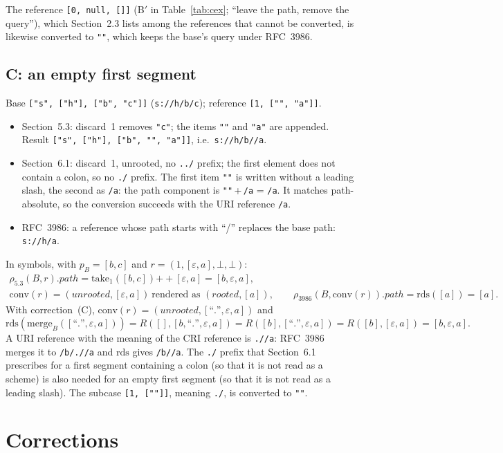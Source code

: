 \documentclass[11pt,a4paper]{article}
\theoremstyle{remark}
\newcommand{\cri}[1]{\texttt{#1}}
\newcommand{\uri}[1]{\texttt{#1}}
\newcommand{\rds}{\mathrm{rds}}
\newcommand{\mergef}{\mathrm{merge}}
\newcommand{\take}[1]{\mathrm{take}_{#1}}
\newcommand{\res}{\rho_{5.3}}
\newcommand{\rfc}{\rho_{3986}}
\newcommand{\conv}{\mathrm{conv}}
\newcommand{\e}{\varepsilon}
\newcommand{\seq}[1]{[#1]}
\begin{document}
The reference \cri{[0, null, []]} (B$'$ in Table~\ref{tab:cex}; ``leave the path, remove the query''),
which Section~2.3 lists among the references that cannot be converted, is likewise converted to
\uri{""}, which keeps the base's query under RFC~3986.

\subsection{C: an empty first segment}
Base \cri{["s", ["h"], ["b", "c"]]} (\uri{s://h/b/c}); reference \cri{[1, ["", "a"]]}.
\begin{itemize}[nosep]
\item Section~5.3: discard~1 removes \cri{"c"}; the items \cri{""} and \cri{"a"} are appended. Result
\cri{["s", ["h"], ["b", "", "a"]]}, i.e.\ \uri{s://h/b//a}.
\item Section~6.1: discard~1, unrooted, no \uri{../} prefix; the first element does not contain a colon,
so no \uri{./} prefix. The first item \cri{""} is written without a leading slash, the second as
\uri{/a}: the path component is \uri{""}\,+\,\uri{/a} = \uri{/a}. It matches path-absolute, so the
conversion succeeds with the URI reference \uri{/a}.
\item RFC~3986: a reference whose path starts with ``/'' replaces the base path: \uri{s://h/a}.
\end{itemize}
In symbols, with $p_B=\seq{b,c}$ and $r=(1,\seq{\e,a},\bot,\bot)$:
\begin{gather*}
\res(B,r).\mathit{path}=\take{1}(\seq{b,c})\mathbin{+\!\!+}\seq{\e,a}=\seq{b,\e,a},\\
\conv(r)=(\mathit{unrooted},\seq{\e,a})\ \text{rendered as }(\mathit{rooted},\seq{a}),\qquad
\rfc(B,\conv(r)).\mathit{path}=\rds(\seq{a})=\seq{a}.
\end{gather*}
With correction~(C), $\conv(r)=(\mathit{unrooted},\seq{\text{``.''},\e,a})$ and
\[
\rds(\mergef_B(\seq{\text{``.''},\e,a}))=R(\seq{},\seq{b,\text{``.''},\e,a})=R(\seq{b},\seq{\text{``.''},\e,a})=R(\seq{b},\seq{\e,a})=\seq{b,\e,a}.
\]
A URI reference with the meaning of the CRI reference is \uri{.//a}: RFC~3986 merges it to
\uri{/b/.//a} and $\rds$ gives \uri{/b//a}. The \uri{./} prefix that Section~6.1 prescribes for a first
segment containing a colon (so that it is not read as a scheme) is also needed for an empty first segment
(so that it is not read as a leading slash). The subcase \cri{[1, [""]]}, meaning \uri{./}, is converted
to \uri{""}.

\section{Corrections}
\label{sec:fix}
\end{document}
